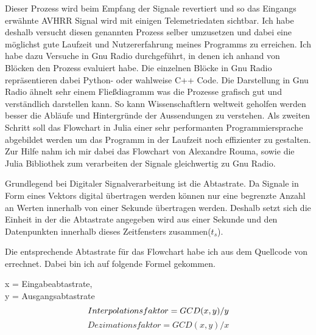 \begin{multicols*}{2}
    \cite{APT-How_it_works}
    Dieser Prozess wird beim Empfang der Signale revertiert und so das Eingangs erwähnte AVHRR Signal wird mit einigen Telemetriedaten sichtbar. Ich habe deshalb versucht diesen genannten Prozess selber umzusetzen und dabei eine möglichst gute Laufzeit und Nutzererfahrung meines Programms zu erreichen. Ich habe dazu Versuche in Gnu Radio durchgeführt, in denen ich anhand von Blöcken den Prozess evaluiert habe. Die einzelnen Blöcke in Gnu Radio repräsentieren dabei Python- oder wahlweise C++ Code. Die Darstellung in Gnu Radio ähnelt sehr einem Fließdiagramm was die Prozesse grafisch gut und verständlich darstellen kann. So kann Wissenschaftlern weltweit geholfen werden besser die Abläufe und Hintergründe der Aussendungen zu verstehen. Als zweiten Schritt soll das Flowchart in Julia einer sehr performanten Programmiersprache abgebildet werden um das Programm in der Laufzeit noch effizienter zu gestalten. Zur Hilfe nahm ich mir dabei das Flowchart von Alexandre Rouma\cite{AlexandreRouma}, sowie die Julia Bibliothek \cite[]{DSP.jl} zum verarbeiten der Signale gleichwertig zu Gnu Radio. 

    Grundlegend bei Digitaler Signalverarbeitung ist die Abtastrate. Da Signale in Form eines Vektors digital übertragen werden können nur eine begrenzte Anzahl an Werten innerhalb von einer Sekunde übertragen werden. Deshalb setzt sich die Einheit in der die Abtastrate angegeben wird aus einer Sekunde und den Datenpunkten innerhalb dieses Zeitfensters zusammen(\( t_s \)).
    
\newpage
    Die entsprechende Abtastrate für das Flowchart habe ich aus dem Quellcode von \cite{APT-How_it_works} errechnet. Dabei bin ich auf folgende Formel gekommen.
    
    x = Eingabeabtastrate,\\ y = Ausgangsabtastrate
    \begin{equation}
        Interpolationsfaktor = GCD(x,y) / y \\
    \end{equation}
    \begin{equation}
        Dezimationsfaktor = GCD(x,y) / x 
    \end{equation}


\end{multicols*}
